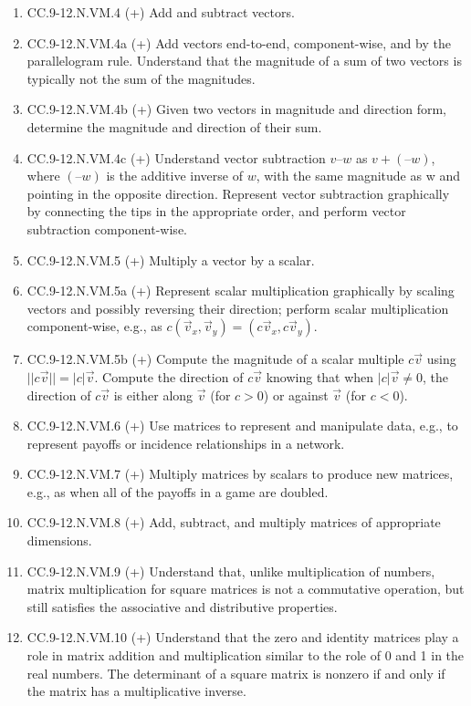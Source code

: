 \documentclass{article}
\begin{document}
\begin{enumerate}
	\item CC.9-12.N.VM.4 (+)  Add and subtract vectors.
	\item CC.9-12.N.VM.4a (+) Add vectors end-to-end, component-wise, and by the parallelogram rule. Understand that the magnitude of a sum of two vectors is typically not the sum of the magnitudes.
	\item CC.9-12.N.VM.4b (+) Given two vectors in magnitude and direction form, determine the magnitude and direction of their sum. 
	\item CC.9-12.N.VM.4c (+) Understand vector subtraction $v – w$ as $v + (–w)$, where $(–w)$ is the additive inverse of $w$, with the same magnitude as w and pointing in the opposite direction. Represent vector subtraction graphically by connecting the tips in the appropriate order, and perform vector subtraction component-wise.
	\item CC.9-12.N.VM.5 (+)  Multiply a vector by a scalar.
	\item CC.9-12.N.VM.5a (+) Represent scalar multiplication graphically by scaling vectors and possibly reversing their direction; perform scalar multiplication component-wise, e.g., as $c(\vec{v}_x, \vec{v}_y) = (c\vec{v}_x, c\vec{v}_y)$.
	\item CC.9-12.N.VM.5b (+) Compute the magnitude of a scalar multiple $c\vec{v}$ using $||c\vec{v}|| =|c|\vec{v}$. Compute the direction of $c\vec{v}$ knowing that when $|c|\vec{v} \neq 0$, the direction of $c\vec{v}$ is either along $\vec{v}$ (for $c > 0$) or against $\vec{v}$ (for $c < 0$).
	\item CC.9-12.N.VM.6 (+)  Use matrices to represent and manipulate data, e.g., to represent payoffs or incidence relationships in a network. 
	\item CC.9-12.N.VM.7 (+)  Multiply matrices by scalars to produce new matrices, e.g., as when all of the payoffs in a game are doubled. 
	\item CC.9-12.N.VM.8 (+)  Add, subtract, and multiply matrices of appropriate dimensions.
	\item CC.9-12.N.VM.9 (+) Understand that, unlike multiplication of numbers, matrix multiplication for square matrices is not a commutative operation, but still satisfies the associative and distributive properties. 
	\item CC.9-12.N.VM.10 (+) Understand that the zero and identity matrices play a role in matrix addition and multiplication similar to the role of 0 and 1 in the real numbers. The determinant of a square matrix is nonzero if and only if the matrix has a multiplicative inverse. 

\end{enumerate}
\end{document}
